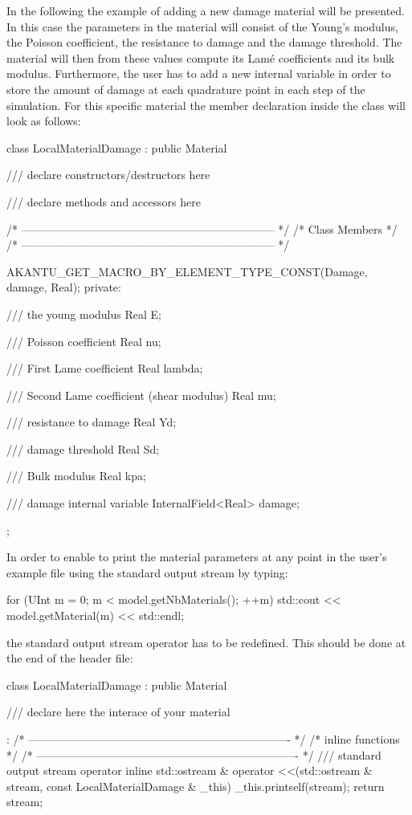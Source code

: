 In the following the example of adding a new damage material will be
presented. In this case the parameters in the material will consist of the
Young's modulus, the Poisson coefficient, the resistance to damage and the
damage threshold. The material will then from these values compute its Lam\'{e}
coefficients and its bulk modulus. Furthermore, the user has to add a new
internal variable  in order to store the amount of damage at each
quadrature point in each step of the simulation. For this specific material the
member declaration inside the class will look as follows:
\begin{cpp}
class LocalMaterialDamage : public Material {

/// declare constructors/destructors here

/// declare methods and accessors here

  /* -------------------------------------------------------------------- */
  /* Class Members                                                        */
  /* -------------------------------------------------------------------- */

  AKANTU_GET_MACRO_BY_ELEMENT_TYPE_CONST(Damage, damage, Real);
private:

  /// the young modulus
  Real E;

  /// Poisson coefficient
  Real nu;

  /// First Lame coefficient
  Real lambda;

  /// Second Lame coefficient (shear modulus)
  Real mu;

  /// resistance to damage
  Real Yd;

  /// damage threshold
  Real Sd;

  /// Bulk modulus
  Real kpa;

  /// damage internal variable
  InternalField<Real> damage;

};
\end{cpp}
In order to enable to print the material parameters at any point in
the user's example file using the standard output stream by typing:
\begin{cpp}
for (UInt m = 0; m  < model.getNbMaterials(); ++m)
  std::cout << model.getMaterial(m) << std::endl;
\end{cpp}
the standard output stream operator has to be redefined. This should be done at the end of the header file:
\begin{cpp}
class LocalMaterialDamage : public Material {

  /// declare here the interace of your material

}:
/* ---------------------------------------------------------------------- */
/* inline functions                                                       */
/* ---------------------------------------------------------------------- */
/// standard output stream operator
inline std::ostream & operator <<(std::ostream & stream, const LocalMaterialDamage & _this)
{
  _this.printself(stream);
  return stream;
}
\end{cpp}
